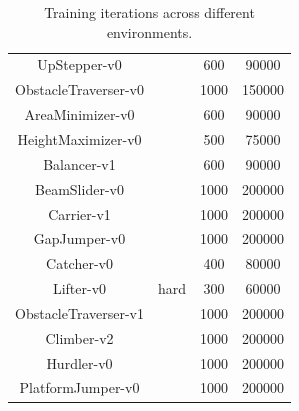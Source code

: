 \documentclass{article}
\begin{document}
\begin{table}[H]
\begin{tabular}{cccc}
            UpStepper-v0           &                         & 600                                     & 90000                              \\
            ObstacleTraverser-v0   &                         & 1000                                    & 150000                             \\
            AreaMinimizer-v0       &                         & 600                                     & 90000                              \\
            HeightMaximizer-v0     &                         & 500                                     & 75000                              \\
            Balancer-v1            &                         & 600                                     & 90000                              \\
            \midrule BeamSlider-v0 & \multirow{9}{*}{hard}   & 1000                                    & 200000                             \\
            Carrier-v1             &                         & 1000                                    & 200000                             \\
            GapJumper-v0           &                         & 1000                                    & 200000                             \\
            Catcher-v0             &                         & 400                                     & 80000                              \\
            Lifter-v0              &                         & 300                                     & 60000                              \\
            ObstacleTraverser-v1   &                         & 1000                                    & 200000                             \\
            Climber-v2             &                         & 1000                                    & 200000                             \\
            Hurdler-v0             &                         & 1000                                    & 200000                             \\
            PlatformJumper-v0      &                         & 1000                                    & 200000                             \\
            \bottomrule
        \end{tabular}
        \caption{Training iterations across different environments.}
        \label{tab:env_training_iters}
    \end{table}
    \clearpage
\end{document}
